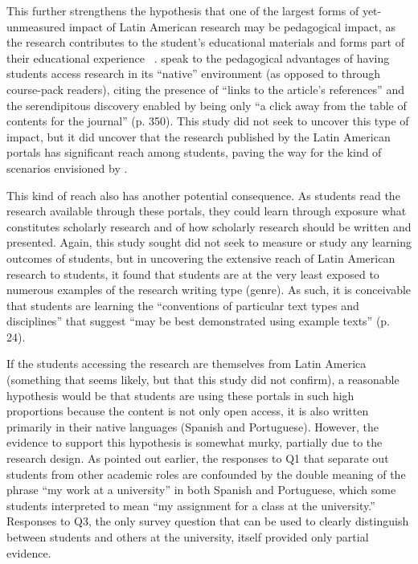 This further strengthens the hypothesis that one of the largest forms of yet-unmeasured impact of Latin American research may be pedagogical impact, as the research contributes to the student's educational materials and forms part of their educational experience ~\citep{Evans2013}.  \citet{Evans2013} speak to the pedagogical advantages of having students access research in its ``native'' environment (as opposed to through course-pack readers), citing the presence of ``links to the article's references'' and the serendipitous discovery enabled by being only ``a click away from the table of contents for the journal'' (p. 350). This study did not seek to uncover this type of impact, but it did uncover that the research published by the Latin American portals has significant reach among students, paving the way for the kind of scenarios envisioned by  \citet{Evans2013}.

This kind of reach also has another potential consequence. As students read the research available through these portals, they could learn through exposure what constitutes scholarly research and of how scholarly research should be written and presented. Again, this study sought did not seek to measure or study any learning outcomes of students, but in uncovering the extensive reach of Latin American research to students, it found that students are at the very least exposed to numerous examples of the research writing type (genre). As such, it is conceivable that students are learning the ``conventions of particular text types and disciplines'' that  \citet{Curry2005} suggest ``may be best demonstrated using example texts'' (p. 24).

If the students accessing the research are themselves from Latin America (something that seems likely, but that this study did not confirm), a reasonable hypothesis would be that students are using these portals in such high proportions because the content is not only open access, it is also written primarily in their native languages (Spanish and Portuguese). However, the evidence to support this hypothesis is somewhat murky, partially due to the research design. As pointed out earlier, the responses to Q1 that separate out students from other academic roles are confounded by the double meaning of the phrase ``my work at a university'' in both Spanish and Portuguese, which some students interpreted to mean ``my assignment for a class at the university.'' Responses to Q3, the only survey question that can be used to clearly distinguish between students and others at the university, itself provided only partial evidence.

